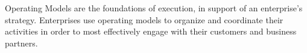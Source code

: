 %
%
Operating Models are the foundations of execution, in support of an enterprise's strategy.
Enterprises use operating models to organize and coordinate their activities in order to most effectively engage
with their customers and business partners.
